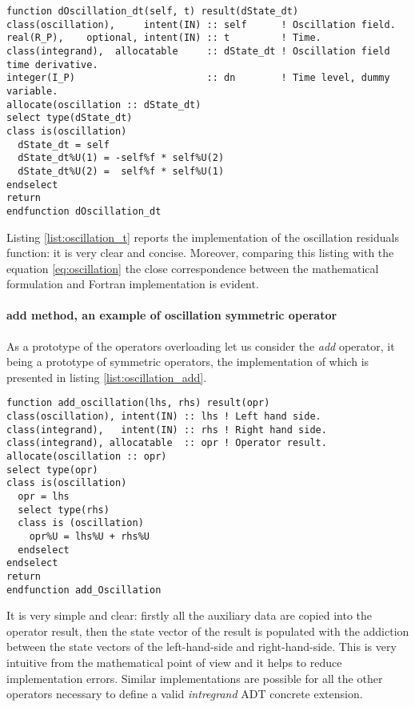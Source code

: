 \documentclass[pdftex,preprint,3p,times,numbers]{elsarticle}
\begin{document}
\begin{lstlisting}[firstnumber=1,style=code,caption={implementation of the \emph{oscillation integrand} residuals function},label={list:oscillation_t}]
function dOscillation_dt(self, t) result(dState_dt)
class(oscillation),     intent(IN) :: self      ! Oscillation field.
real(R_P),    optional, intent(IN) :: t         ! Time.
class(integrand),  allocatable     :: dState_dt ! Oscillation field time derivative.
integer(I_P)                       :: dn        ! Time level, dummy variable.
allocate(oscillation :: dState_dt)
select type(dState_dt)
class is(oscillation)
  dState_dt = self
  dState_dt%U(1) = -self%f * self%U(2)
  dState_dt%U(2) =  self%f * self%U(1)
endselect
return
endfunction dOscillation_dt
\end{lstlisting}

Listing \ref{list:oscillation_t} reports the implementation of the oscillation residuals function: it is very clear and concise. Moreover, comparing this listing with the equation \ref{eq:oscillation} the close correspondence between the mathematical formulation and Fortran implementation is evident.

\paragraph{add method, an example of oscillation symmetric operator}

As a prototype of the operators overloading let us consider the \emph{add} operator, it being a prototype of symmetric operators, the implementation of which is presented in listing \ref{list:oscillation_add}.

\begin{lstlisting}[firstnumber=1,style=code,caption={implementation of the \emph{oscillation integrand} add operator},label={list:oscillation_add}]
function add_oscillation(lhs, rhs) result(opr)
class(oscillation), intent(IN) :: lhs ! Left hand side.
class(integrand),   intent(IN) :: rhs ! Right hand side.
class(integrand), allocatable  :: opr ! Operator result.
allocate(oscillation :: opr)
select type(opr)
class is(oscillation)
  opr = lhs
  select type(rhs)
  class is (oscillation)
    opr%U = lhs%U + rhs%U
  endselect
endselect
return
endfunction add_Oscillation
\end{lstlisting}
It is very simple and clear: firstly all the auxiliary data are copied into the operator result, then the state vector of the result is populated with the addiction between the state vectors of the left-hand-side and right-hand-side. This is very intuitive from the mathematical point of view and it helps to reduce implementation errors. Similar implementations are possible for all the other operators necessary to define a valid \emph{intregrand} ADT concrete extension.
\end{document}
